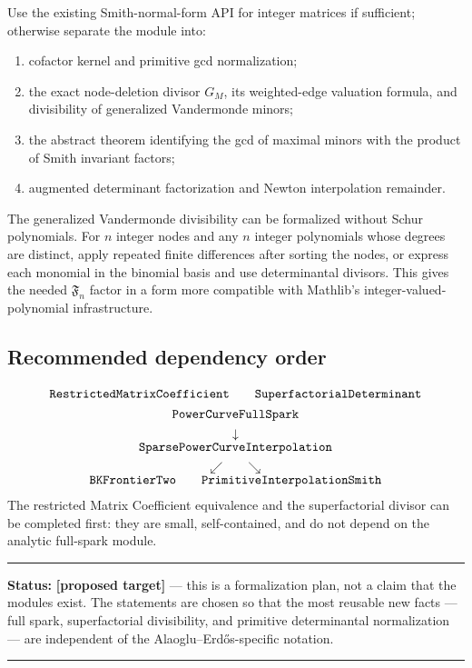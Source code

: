 \documentclass[11pt,oneside]{article}
\theoremstyle{definition}
\theoremstyle{remark}
\newcommand{\lean}[1]{\texttt{\detokenize{#1}}}
\newcommand{\statusopen}{\textcolor{classicalgray}{\textbf{[proposed target]}}}
\newcommand{\SF}[1]{\mathfrak F_{#1}}
\newenvironment{statusbox}[1]
{\begin{center}\begin{minipage}{0.94\textwidth}\raggedright\hbadness=10000\hrule
\vspace{0.45em}\textbf{Status:} #1\par\vspace{0.35em}}
{\vspace{0.35em}\hrule\end{minipage}\end{center}}
\begin{document}
Use the existing Smith-normal-form API for integer matrices if sufficient; otherwise separate
the module into:
\begin{enumerate}
\item cofactor kernel and primitive gcd normalization;
\item the exact node-deletion divisor $G_M$, its weighted-edge valuation formula, and
      divisibility of generalized Vandermonde minors;
\item the abstract theorem identifying the gcd of maximal minors with the product of Smith
      invariant factors;
\item augmented determinant factorization and Newton interpolation remainder.
\end{enumerate}

The generalized Vandermonde divisibility can be formalized without Schur polynomials.  For
$n$ integer nodes and any $n$ integer polynomials whose degrees are distinct, apply repeated
finite differences after sorting the nodes, or express each monomial in the binomial basis and
use determinantal divisors.  This gives the needed $\SF n$ factor in a form more compatible
with Mathlib's integer-valued-polynomial infrastructure.

\subsection{Recommended dependency order}

\[
\begin{array}{c}
\lean{RestrictedMatrixCoefficient}
\qquad
\lean{SuperfactorialDeterminant}
\\[4pt]
\lean{PowerCurveFullSpark}
\\[4pt]\downarrow\\[-2pt]
\lean{SparsePowerCurveInterpolation}
\\[4pt]\swarrow\qquad\searrow\\[-2pt]
\lean{BKFrontierTwo}
\qquad
\lean{PrimitiveInterpolationSmith}
\end{array}
\]
The restricted Matrix Coefficient equivalence and the superfactorial divisor can be completed
first: they are small, self-contained, and do not depend on the analytic full-spark module.

\begin{statusbox}{\statusopen{} --- this is a formalization plan, not a claim that the modules
exist.  The statements are chosen so that the most reusable new facts --- full spark,
superfactorial divisibility, and primitive determinantal normalization --- are independent of
the Alaoglu--Erd\H{o}s-specific notation.}
\end{statusbox}
\end{document}
